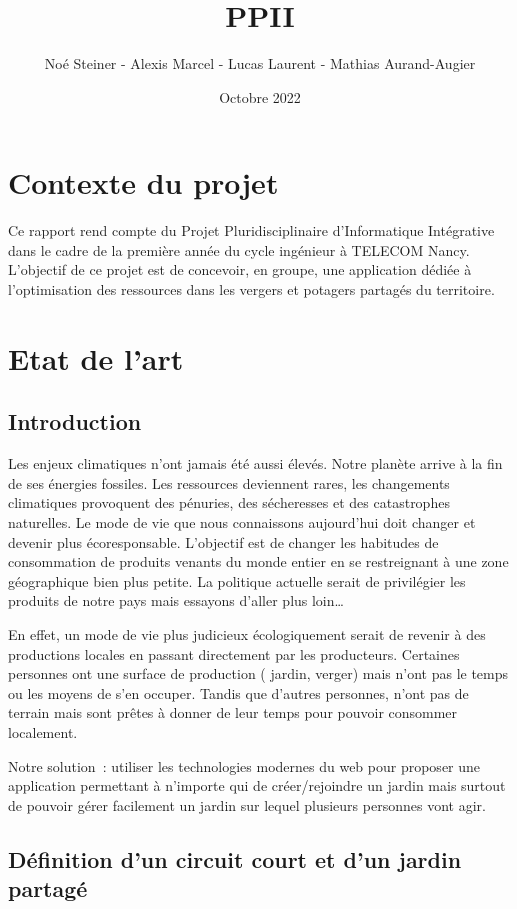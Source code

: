 \documentclass[french,a4paper]{article}
\title{PPII}
\author{Noé Steiner - Alexis Marcel - Lucas Laurent - Mathias Aurand-Augier}
\date{Octobre 2022}
\begin{document}
\maketitle
\newpage
\tableofcontents
\newpage
\section{Contexte du projet}
Ce rapport rend compte du Projet Pluridisciplinaire d’Informatique Intégrative dans le cadre de la première année du cycle ingénieur à TELECOM Nancy.
L’objectif de ce projet est de concevoir, en groupe,  une application dédiée à l’optimisation des ressources dans les vergers et potagers partagés du territoire.

\newpage
\section{Etat de l'art}
\subsection{Introduction}
Les enjeux climatiques n’ont jamais été aussi élevés. Notre planète arrive à la fin de ses énergies fossiles. Les ressources deviennent rares, les changements climatiques provoquent des pénuries, des sécheresses et des catastrophes naturelles. Le mode de vie que nous connaissons aujourd’hui doit changer et devenir plus écoresponsable. L’objectif est de changer les habitudes de consommation de produits venants du monde entier en se restreignant à une zone géographique bien plus petite. La politique actuelle serait de privilégier les produits de notre pays mais essayons d’aller plus loin…

En effet, un mode de vie plus judicieux écologiquement serait de revenir à des productions locales en passant directement par les producteurs. Certaines personnes ont une surface de production ( jardin, verger) mais n’ont pas le temps ou les moyens de s’en occuper. Tandis que d’autres personnes, n’ont pas de terrain mais sont prêtes à donner de leur temps pour pouvoir consommer localement.

Notre solution~: utiliser les technologies modernes du web pour proposer une application permettant à n’importe qui de créer/rejoindre un jardin mais surtout de pouvoir gérer facilement un jardin sur lequel plusieurs personnes vont agir.

\subsection{Définition d’un circuit court et d’un jardin partagé}
\end{document}
